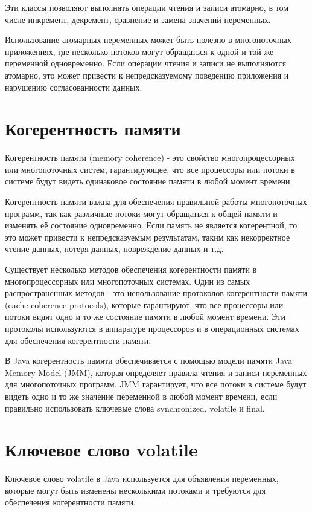 Эти классы позволяют выполнять операции чтения и записи атомарно, в том числе инкремент, декремент, сравнение и замена значений переменных.

Использование атомарных переменных может быть полезно в многопоточных приложениях, где несколько потоков могут обращаться к одной и той же переменной одновременно. Если операции чтения и записи не выполняются атомарно, это может привести к непредсказуемому поведению приложения и нарушению согласованности данных.

\section{Когерентность памяти}

Когерентность памяти (memory coherence) - это свойство многопроцессорных или многопоточных систем, гарантирующее, что все процессоры или потоки в системе будут видеть одинаковое состояние памяти в любой момент времени.

Когерентность памяти важна для обеспечения правильной работы многопоточных программ, так как различные потоки могут обращаться к общей памяти и изменять её состояние одновременно. Если память не является когерентной, то это может привести к непредсказуемым результатам, таким как некорректное чтение данных, потеря данных, повреждение данных и т.д.

Существует несколько методов обеспечения когерентности памяти в многопроцессорных или многопоточных системах. Один из самых распространенных методов - это использование протоколов когерентности памяти (cache coherence protocols), которые гарантируют, что все процессоры или потоки видят одно и то же состояние памяти в любой момент времени. Эти протоколы используются в аппаратуре процессоров и в операционных системах для обеспечения когерентности памяти.

В Java когерентность памяти обеспечивается с помощью модели памяти Java Memory Model (JMM), которая определяет правила чтения и записи переменных для многопоточных программ. JMM гарантирует, что все потоки в системе будут видеть одно и то же значение переменной в любой момент времени, если правильно использовать ключевые слова synchronized, volatile и final.

\section{Ключевое слово volatile}

Ключевое слово volatile в Java используется для объявления переменных, которые могут быть изменены несколькими потоками и требуются для обеспечения когерентности памяти.

